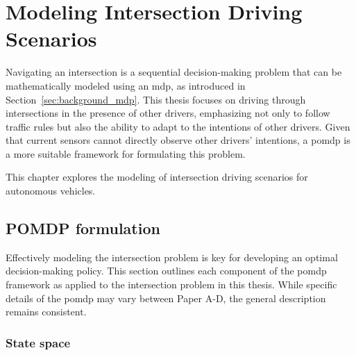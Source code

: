 \newcommand {\matr}[2]{\left[\begin{array}{#1}#2\end{array}\right]}

\chapter{Modeling Intersection Driving Scenarios}
\label{ch:modeling_intersection}

Navigating an intersection is a sequential decision-making problem that can be mathematically modeled using an \gls{mdp}, as introduced in Section~\ref{sec:background_mdp}. This thesis focuses on driving through intersections in the presence of other drivers, emphasizing not only to follow traffic rules but also the ability to adapt to the intentions of other drivers. Given that current sensors cannot directly observe other drivers' intentions, a \gls{pomdp} is a more suitable framework for formulating this problem.

This chapter explores the modeling of intersection driving scenarios for autonomous vehicles. 

\section{POMDP formulation}
\label{sec:pomdp_fomulation}
Effectively modeling the intersection problem is key for developing an optimal decision-making policy. This section outlines each component of the \gls{pomdp} framework as applied to the intersection problem in this thesis. While specific details of the \gls{pomdp} may vary between Paper A-D, the general description remains consistent. 

\subsection{State space}
\label{sec:pomdp_statespace}

